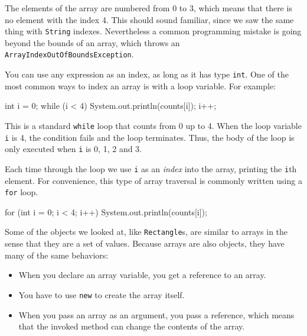 \documentclass[12pt]{book}
\makeatletter
\theoremstyle{exercise}
\newcommand{\java}[1]{\verb"#1"}
\renewcommand{\section}{\@startsection {section}{1}{\z@}%
    {-3.5ex \@plus -1ex \@minus -.2ex}%
    {0.7ex \@plus.2ex}%
    {\normalfont\Large\bfseries}}
\newcommand{\java}[1]{\lstinline{#1}} %
\makeatother
\begin{document}

The elements of the array are numbered from 0 to 3, which means that there is no element with the index 4.
This should sound familiar, since we saw the same thing with \java{String} indexes.
Nevertheless a common programming mistake is going beyond the bounds of an array, which throws an \java{ArrayIndexOutOfBoundsException}.

You can use any expression as an index, as long as it has type \java{int}.
One of the most common ways to index an array is with a loop variable.
For example:

\begin{code}
    int i = 0;
    while (i < 4) {
        System.out.println(counts[i]);
        i++;
    }
\end{code}


This is a standard \java{while} loop that counts from 0 up to 4.
When the loop variable \java{i} is 4, the condition fails and the loop terminates.
Thus, the body of the loop is only executed when \java{i} is 0, 1, 2 and 3.

Each time through the loop we use \java{i} as an {\it index} into the array, printing the \java{i}th element.
For convenience, this type of array traversal is commonly written using a \java{for} loop.

\begin{code}
    for (int i = 0; i < 4; i++) {
        System.out.println(counts[i]);
    }
\end{code}



Some of the objects we looked at, like \java{Rectangle}s, are similar to arrays in the sense that they are a set of values.
Because arrays are also objects, they have many of the same behaviors:

\begin{itemize}

\item When you declare an array variable, you get a reference to an array.

\item You have to use \java{new} to create the array itself.

\item When you pass an array as an argument, you pass a reference, which means that the invoked method can change the contents of the array.

\end{itemize}
\end{document}
